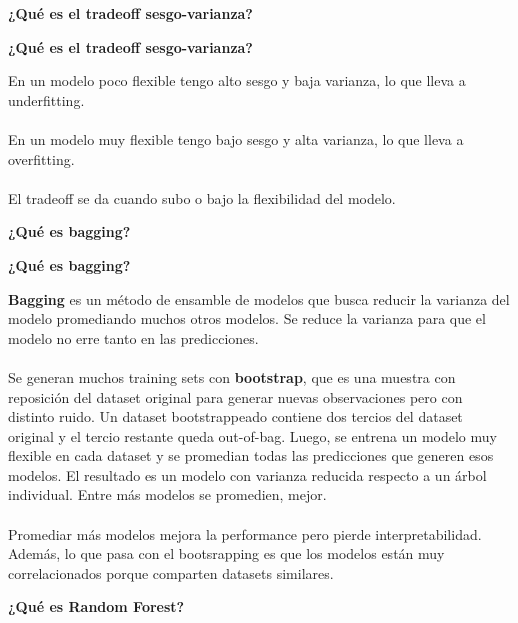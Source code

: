 \documentclass[10pt]{memoir}
\begin{document}
\clearpage
\begin{center}
	\textbf{\Large ¿Qué es el tradeoff sesgo-varianza?} \\
\end{center}

\clearpage
\begin{center}
	\textbf{\Large ¿Qué es el tradeoff sesgo-varianza?} \\
\end{center}
\noindent En un modelo poco flexible tengo alto sesgo y baja varianza, lo que lleva a underfitting. \\
\\
\noindent En un modelo muy flexible tengo bajo sesgo y alta varianza, lo que lleva a overfitting. \\
\\
\noindent El tradeoff se da cuando subo o bajo la flexibilidad del modelo.

\clearpage
\begin{center}
	\textbf{\Large ¿Qué es bagging?} \\
\end{center}

\clearpage
\begin{center}
	\textbf{\Large ¿Qué es bagging?} \\
\end{center}
\noindent \textbf{Bagging} es un método de ensamble de modelos que busca reducir la varianza del modelo promediando muchos otros modelos. Se reduce la varianza para que el modelo no erre tanto en las predicciones. \\
\\
Se generan muchos training sets con \textbf{bootstrap}, que es una muestra con reposición del dataset original para generar nuevas observaciones pero con distinto ruido. Un dataset bootstrappeado contiene dos tercios del dataset original y el tercio restante queda out-of-bag. Luego, se entrena un modelo muy flexible en cada dataset y se promedian todas las predicciones que generen esos modelos. El resultado es un modelo con varianza reducida respecto a un árbol individual. Entre más modelos se promedien, mejor. \\
\\
Promediar más modelos mejora la performance pero pierde interpretabilidad. Además, lo que pasa con el bootsrapping es que los modelos están muy correlacionados porque comparten datasets similares.

\clearpage
\begin{center}
	\textbf{\Large ¿Qué es Random Forest?} \\
\end{center}
\end{document}
